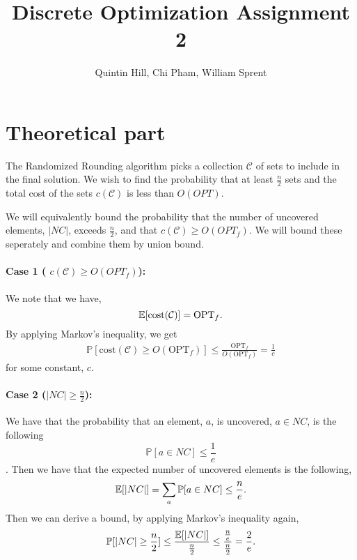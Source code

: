 \documentclass[11pt,a4paper,english]{article}
\newcommand{\PP}{\mathbb{P}}      %
\newcommand{\EE}{\mathbb{E}}      %
\begin{document}
\title{Discrete Optimization Assignment 2}
\author{Quintin Hill, Chi Pham, William Sprent}
\maketitle
\tableofcontents
\clearpage

\section{Theoretical part}
The Randomized Rounding algorithm picks a collection $\mathcal{C}$ of sets to include in
the final solution. We wish to find the probability that at least $\frac{n}{2}$ sets and
the total cost of the sets $c(\mathcal{C})$ is less than $O(OPT)$.

We will equivalently bound the probability that the number of uncovered elements, $|NC|$,
exceeds $\frac{n}{2}$, and that $c(\mathcal{C}) \geq O(OPT_f)$. We will bound these seperately
and combine them by union bound.

\paragraph{Case 1 ( $c(\mathcal{C}) \geq O(OPT_f)$):}
We note that we have,
$$\EE[\mathrm{cost}(\mathcal{C})] = \mathrm{OPT}_f\mathnormal{.}$$
By applying Markov's inequality, we get
\begin{align*}
\PP[\mathrm{cost}(\mathcal{C}) \geq O(\mathrm{OPT}_f)]
  \leq \frac{\mathrm{OPT}_f}{O(\mathrm{OPT}_f)}
  = \frac{1}{c}
\end{align*}
for some constant, $c$.

\paragraph{Case 2 ($|NC| \geq \frac{n}{2}$):}
We have that the probability that an element, $a$, is uncovered, $a \in NC$, is the following
$$\PP[a \in NC] \leq \frac{1}{e}$$
\citep[p. 121]{Vaz}.
Then we have that the expected number of uncovered elements is the following,
$$\EE[|NC|] = \sum_a \PP[a \in NC] \leq \frac{n}{e}\mathnormal{.}$$
Then we can derive a bound, by applying Markov's inequality again,
\begin{align*}
  \PP[|NC| \geq \frac{n}{2}] \leq \frac{\EE[|NC|]}{\frac{n}{2}} 
                             \leq \frac{\frac{n}{e}}{\frac{n}{2}} 
                             = \frac{2}{e}\mathnormal{.}
\end{align*}
\end{document}
